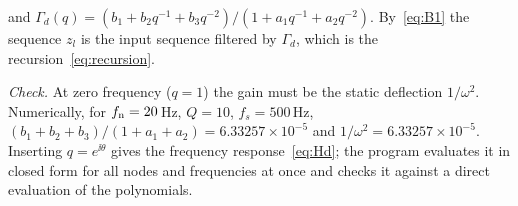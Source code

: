 and $\Gamma_d(q) = (b_1+b_2q^{-1}+b_3q^{-2})/(1+a_1q^{-1}+a_2q^{-2})$. By~\eqref{eq:B1} the sequence
$z_l$ is the input sequence filtered by $\Gamma_d$, which is the recursion~\eqref{eq:recursion}.

\emph{Check.} At zero frequency ($q=1$) the gain must be the static deflection $1/\omega^2$.
Numerically, for $f_{\mathrm{n}} = 20$\,Hz, $Q=10$, $f_s = 500$\,Hz, $(b_1+b_2+b_3)/(1+a_1+a_2) = 6.33257\times10^{-5}$
and $1/\omega^2 = 6.33257\times10^{-5}$. Inserting $q = e^{\ii\theta}$ gives the frequency
response~\eqref{eq:Hd}; the program evaluates it in closed form for all nodes and frequencies at once
and checks it against a direct evaluation of the polynomials.
